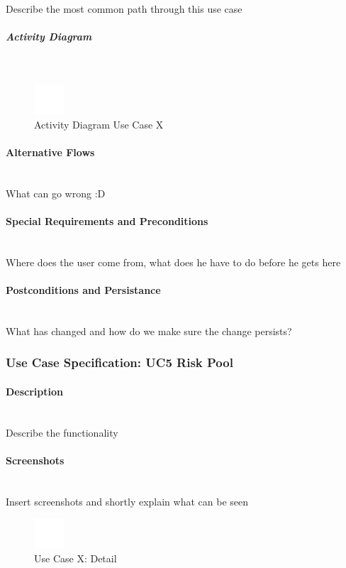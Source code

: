 Describe the most common path through this use case

\subparagraph{Activity Diagram}\mbox{}\\
\begin{figure}[h]
	\centering
	\includegraphics[width=0.1\textwidth]{Content/Domain/placeholder.png}
	\caption{Activity Diagram Use Case X}
	\label{fig:label44}
\end{figure}

\paragraph*{Alternative Flows}\mbox{}\\
What can go wrong :D

\paragraph*{Special Requirements and Preconditions}\mbox{}\\
Where does the user come from, what does he have to do before he gets here

\paragraph*{Postconditions and Persistance}\mbox{}\\
What has changed and how do we make sure the change persists?

\newpage
\subsubsection{Use Case Specification: \ac{UC}5 Risk Pool}
\label{sec:domainBbf}

\paragraph*{Description}\mbox{}\\
Describe the functionality

\paragraph*{Screenshots}\mbox{}\\
Insert screenshots and shortly explain what can be seen
\begin{figure}[h] 
	\centering
	\includegraphics[width=0.1\textwidth]{Content/Domain/placeholder.png}
	\caption{Use Case X: Detail}
	\label{fig:label5}
\end{figure}

